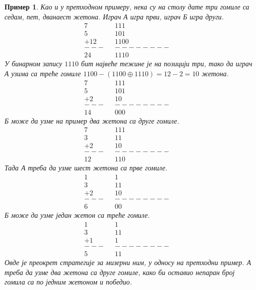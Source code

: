 \documentclass[a4paper]{article}
\newtheorem{example}{Пример}
\begin{document}
\begin{example}
	Као и у претходном примеру, нека су на столу дате три гомиле са седам, пет, дванаест жетона. Играч \textit{А} игра први, играч \textit{Б} игра други.	
		\begin{align*}
			7&		&   1 1 1&\\
			5&		&   1 0 1&\\
			+12&	& 1 1 0 0&\\
			---&	&--------&\\
			24&		& 1 1 1 0
		\end{align*}		
	У бинарном запису $ 1 1 1 0 $ бит највеће тежине је на позицији три, тако да играч \textit{А} узима са треће гомиле $ 1 1 0 0 - (1 1 0 0 \oplus  1 1 1 0) = 12 - 2 = 10 $  жетона.	
		\begin{align*}
			7&		&  	1 1 1&\\
			5&		&   1 0 1&\\
			+2&		&  	  1 0&\\
			---&	&--------&\\
			14&		&   0 0 0
		\end{align*}
	\textit{Б} може да узме на пример два жетона са друге гомиле.
		\begin{align*}
			7&		&   1 1 1&\\
			3&		&     1 1&\\
			+2&		&  	  1 0&\\
			---&	&--------&\\
			12&		&   1 1 0
		\end{align*}
	Тада \textit{А} треба да узме шест жетона са прве гомиле.
		\begin{align*}
			1&		&       1&\\
			3&		&     1 1&\\
			+2&		&  	  1 0&\\
			---&	&--------&\\
			6&		&     0 0
		\end{align*}
	\textit{Б} може да узме један жетон са треће гомиле.
		\begin{align*}
			1&		&       1&\\
			3&		&     1 1&\\
			+1&		&  	  	1&\\
			---&	&--------&\\
			5&		&     1 1
		\end{align*}	
	Овде је преокрет стратегије за мизерни ним, у односу на претходни пример. \textit{А} треба да узме два жетона са друге гомиле, како би оставио непаран број гомила са по једним жетоном и победио.

\end{example}
\end{document}
